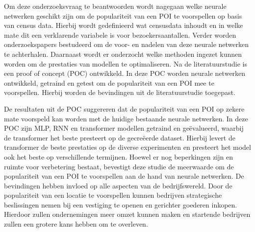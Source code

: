 Om deze onderzoeksvraag te beantwoorden wordt nagegaan welke neurale netwerken geschikt zijn om de populariteit van een POI te voorspellen op basis van census data. Hierbij wordt gedefinieerd wat censusdata inhoudt en in welke mate dit een verklarende variabele is voor bezoekersaantallen. Verder worden onderzoekspapers bestudeerd om de voor- en nadelen van deze neurale netwerken te achterhalen. Daarnaast wordt er onderzocht welke methoden ingezet kunnen worden om de prestaties van modellen te optimaliseren. Na de literatuurstudie is een proof of concept (POC) ontwikkeld. In deze POC worden neurale netwerken ontwikkeld, getraind en getest om de populariteit van een POI mee te voorspellen. Hierbij worden de bevindingen uit de literatuurstudie toegepast.

De resultaten uit de POC suggereren dat de populariteit van een POI op zekere mate voorspeld kan worden met de huidige bestaande neurale netwerken. In deze POC zijn MLP, RNN en transformer modellen getraind en geëvalueerd, waarbij de transformer het beste presteert op de gecreëerde dataset. Hierbij levert de transformer de beste prestaties op de diverse experimenten en presteert het model ook het beste op verschillende termijnen. Hoewel er nog beperkingen zijn en ruimte voor verbetering bestaat, bevestigt deze studie de meerwaarde om de populariteit van een POI te voorspellen aan de hand van neurale netwerken. De bevindingen hebben invloed op alle aspecten van de bedrijfswereld. Door de populariteit van een locatie te voorspellen kunnen bedrijven strategische beslissingen nemen bij een vestiging te openen en gerichter goederen inkopen. Hierdoor zullen ondernemingen meer omzet kunnen maken en startende bedrijven zullen een grotere kans hebben om te overleven. 
